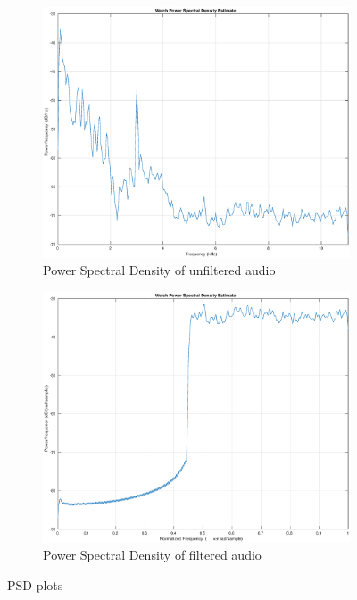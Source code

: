 \documentclass{article}
\begin{document}
\begin{figure}[H]
    \centering
    \begin{subfigure}[b]{0.45\textwidth}
        \centering
        \includegraphics[width=\textwidth]{audio_freq}
        \caption{Power Spectral Density of unfiltered audio}
        \label{fig:psd3}
    \end{subfigure}
    \hfill
    \begin{subfigure}[b]{0.45\textwidth}
        \centering
        \includegraphics[width=\textwidth]{audio_hpf}
        \caption{Power Spectral Density of filtered audio}
        \label{fig:psd4}
    \end{subfigure}
    \caption{PSD plots}
\end{figure}
\end{document}
